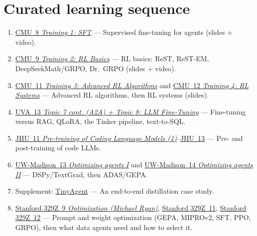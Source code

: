 \documentclass[10pt,oneside]{report}
\begin{document}
\section{Curated learning sequence}
\begin{enumerate}
\item \hyperlink{lec-CMU-8}{CMU~8 \emph{Training 1: SFT}} --- Supervised fine-tuning for agents (slides + video).
\item \hyperlink{lec-CMU-9}{CMU~9 \emph{Training 2: RL Basics}} --- RL basics: ReST, ReST-EM, DeepSeekMath/GRPO, Dr.~GRPO (slides + video).
\item \hyperlink{lec-CMU-11}{CMU~11 \emph{Training 3: Advanced RL Algorithms}} and \hyperlink{lec-CMU-12}{CMU~12 \emph{Training 4: RL Systems}} --- Advanced RL algorithms, then RL systems (slides).
\item \hyperlink{lec-UVA-13}{UVA~13 \emph{Topic 7 cont. (A2A) + Topic 8: LLM Fine-Tuning}} --- Fine-tuning versus RAG, QLoRA, the Tinker pipeline, text-to-SQL.
\item \hyperlink{lec-JHU-11}{JHU~11 \emph{Pre-training of Coding Language Models (1)}}--\hyperlink{lec-JHU-13}{JHU~13} --- Pre- and post-training of code LLMs.
\item \hyperlink{lec-UW-13}{UW-Madison~13 \emph{Optimizing agents I}} and \hyperlink{lec-UW-14}{UW-Madison~14 \emph{Optimizing agents II}} --- DSPy/TextGrad, then ADAS/GEPA.
\item Supplement: \hyperref[sup-tinyagent]{TinyAgent} --- An end-to-end distillation case study.
\item \hyperlink{lec-S329Z-9}{Stanford 329Z~9 \emph{Optimization (Michael Ryan)}}, \hyperlink{lec-S329Z-11}{Stanford 329Z~11}, \hyperlink{lec-S329Z-12}{Stanford 329Z~12} --- Prompt and weight optimization (GEPA, MIPROv2, SFT, PPO, GRPO), then what data agents need and how to select it.
\end{enumerate}
\end{document}
